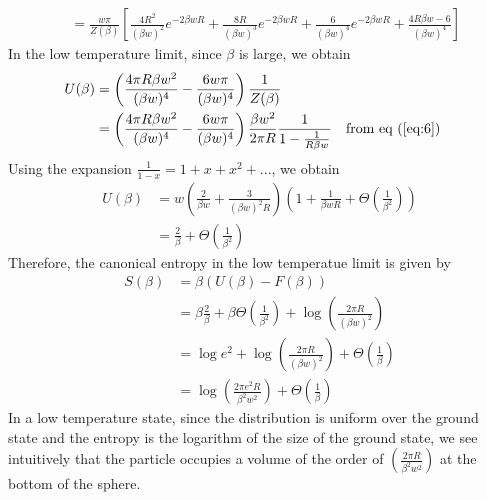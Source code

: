 \documentclass[letterpaper,english,10pt]{article}
\begin{document}
\begin{exmp}[Sphere]
\begin{align}
	&= \frac{w \pi}{Z(\beta)} \left[ \frac{4R^2}{(\beta w)^2}e^{-2 \beta wR} + \frac{8R}{(\beta w)^3}e^{-2 \beta wR} + \frac{6}{(\beta w)^4}e^{-2 \beta wR} + \frac{4R\beta w - 6}{(\beta w)^4} \right] 
\end{align}
In the low temperature limit, since $\beta$ is large, we obtain
\begin{align}
U(\beta) &= \left( \frac{4 \pi R \beta w^2}{(\beta w)^4} - \frac{6w \pi}{(\beta w)^4} \right) \frac{1}{Z(\beta)} \nonumber \\
	&= \left( \frac{4 \pi R \beta w^2}{(\beta w)^4} - \frac{6w \pi}{(\beta w)^4} \right) \frac{\beta w^2}{2 \pi R} \frac{1}{1 - \frac{1}{R \beta w}} \nonumber && \text{from eq (\ref{eq:6})}
\end{align}
Using the expansion $\frac{1}{1-x} = 1 + x + x^2 + ...$, we obtain
\begin{align}
U(\beta) &= w \left( \frac{2}{\beta w} + \frac{3}{(\beta w)^2 R} \right) \left( 1 + \frac{1}{\beta w R} + \Theta\left(\frac{1}{\beta ^ 2}\right) \right) \nonumber \\
	&= \frac{2}{\beta} + \Theta\left(\frac{1}{\beta^2}\right)
\end{align}
Therefore, the canonical entropy in the low temperatue limit is given by
\begin{align}
S(\beta) &= \beta ( U(\beta) - F(\beta) ) \nonumber \\
	&= \beta \frac{2}{\beta} + \beta \Theta\left(\frac{1}{\beta^2}\right) + \log \left( \frac{2 \pi R}{(\beta w)^2} \right) \nonumber \\
	&= \log e^2 + \log \left( \frac{2 \pi R}{(\beta w)^2} \right) + \Theta\left(\frac{1}{\beta}\right) \nonumber \\
	&= \log \left( \frac{2 \pi e^2 R}{\beta^2 w^2} \right) + \Theta\left(\frac{1}{\beta}\right)
\end{align}
In a low temperature state, since the distribution is uniform over the ground state and the entropy is the logarithm of the size of the ground state, we see intuitively that the particle occupies a volume of the order of $\left( \frac{2 \pi R}{\beta^2 w^2} \right)$ at the bottom of the sphere.
\end{exmp}
\end{document}
